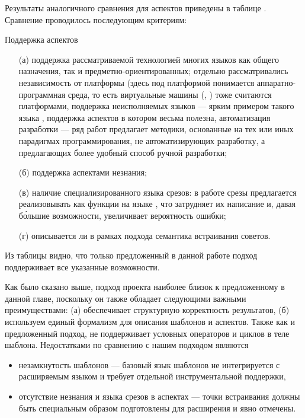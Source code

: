 Результаты аналогичного сравнения для аспектов приведены в таблице .  Сравнение проводилось последующим критериям:
\begin{table}[htb]
	\centering
\newcommand{\dissonly}[1]{#1}

	\caption{Поддержка аспектов}\label{AspTable}
\end{table}
\begin{itemize}
	\item[(а)] поддержка рассматриваемой технологией многих языков как общего назначения, так и предметно-ориентированных; отдельно рассматривались 
		независимость от платформы (здесь под платформой понимается аппаратно-программная среда, то есть виртуальные машины (, ) тоже считаются платформами,
		поддержка неисполняемых языков --- ярким примером такого языка \GRM{}, поддержка аспектов в котором весьма полезна,
		автоматизация разработки --- ряд работ предлагает методики, основанные на тех или иных парадигмах программирования, не автоматизирующих разработку, а предлагающих более удобный способ ручной разработки;
	\item[(б)] поддержка аспектами незнания;
	\item[(в)] наличие специализированного языка срезов: в работе \cite{VanWyk03} срезы предлагается реализовывать как функции на языке , что затрудняет их написание и, давая б\'{о}льшие возможности, увеличивает вероятность ошибки;
	\item[(г)] описывается ли в рамках подхода семантика встраивания советов.
\end{itemize}
Из таблицы видно, что только предложенный в данной работе подход поддерживает все указанные возможности.

Как было сказано выше, подход проекта  \cite{Reuseware} наиболее близок к предложенному в данной главе, поскольку он также обладает следующими важными преимуществами:
(а) обеспечивает структурную корректность результатов, (б) используем единый формализм для описания шаблонов и аспектов. Также как и предложенный подход,  не поддерживает условных операторов и циклов в теле шаблона. Недостатками  по сравнению с нашим подходом являются 
\begin{itemize}
\item незамкнутость шаблонов --- базовый язык шаблонов не интегрируется с расширяемым языком и требует отдельной инструментальной поддержки,
\item отсутствие незнания и языка срезов в аспектах --- точки встраивания должны быть специальным образом подготовлены для расширения и явно отмечены.
\end{itemize}

